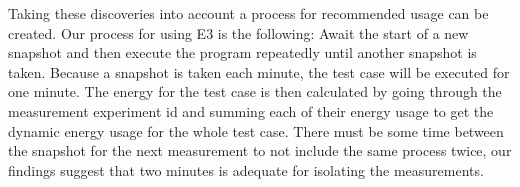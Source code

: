 Taking these discoveries into account a process for recommended usage can be created. Our process for using E3 is the following: Await the start of a new snapshot and then execute the program repeatedly until another snapshot is taken. Because a snapshot is taken each minute, the test case will be executed for one minute. The energy for the test case is then calculated by going through the measurement experiment id and summing each of their energy usage to get the dynamic energy usage for the whole test case. There must be some time between the snapshot for the next measurement to not include the same process twice, our findings suggest that two minutes is adequate for isolating the measurements.    